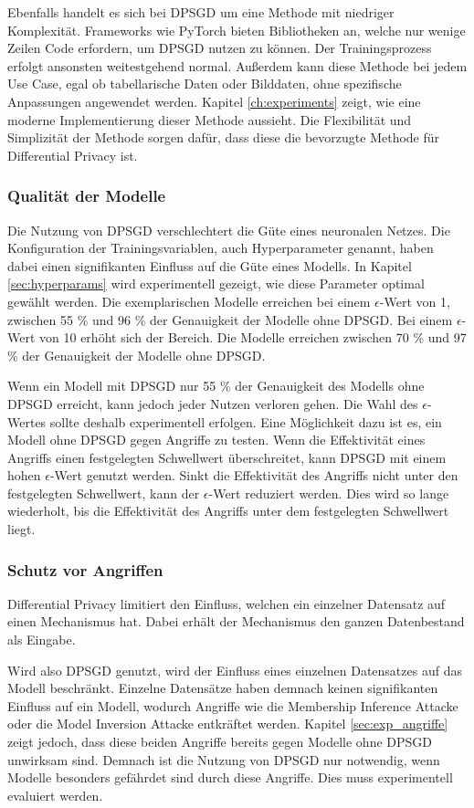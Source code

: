Ebenfalls handelt es sich bei DPSGD um eine Methode mit niedriger Komplexität.
Frameworks wie PyTorch bieten Bibliotheken an, welche nur wenige Zeilen Code erfordern, um DPSGD nutzen zu können.
Der Trainingsprozess erfolgt ansonsten weitestgehend normal.
Außerdem kann diese Methode bei jedem Use Case, egal ob tabellarische Daten oder Bilddaten, ohne spezifische Anpassungen angewendet werden.
Kapitel \ref{ch:experiments} zeigt, wie eine moderne Implementierung dieser Methode aussieht.
Die Flexibilität und Simplizität der Methode sorgen dafür, dass diese die bevorzugte Methode für Differential Privacy ist.

\subsubsection*{Qualität der Modelle}
Die Nutzung von DPSGD verschlechtert die Güte eines neuronalen Netzes.
Die Konfiguration der Trainingsvariablen, auch Hyperparameter genannt, haben dabei einen signifikanten Einfluss auf die Güte eines Modells.
In Kapitel \ref{sec:hyperparams} wird experimentell gezeigt, wie diese Parameter optimal gewählt werden.
Die exemplarischen Modelle erreichen bei einem $\epsilon$-Wert von 1, zwischen 55 \% und 96 \% der Genauigkeit der Modelle ohne DPSGD.
Bei einem $\epsilon$-Wert von 10 erhöht sich der Bereich. 
Die Modelle erreichen zwischen 70 \% und 97 \% der Genauigkeit der Modelle ohne DPSGD.

Wenn ein Modell mit DPSGD nur 55 \% der Genauigkeit des Modells ohne DPSGD erreicht, kann jedoch jeder Nutzen verloren gehen.
Die Wahl des $\epsilon$-Wertes sollte deshalb experimentell erfolgen.
Eine Möglichkeit dazu ist es, ein Modell ohne DPSGD gegen Angriffe zu testen. 
Wenn die Effektivität eines Angriffs einen festgelegten Schwellwert überschreitet, kann DPSGD mit einem hohen $\epsilon$-Wert genutzt werden.
Sinkt die Effektivität des Angriffs nicht unter den festgelegten Schwellwert, kann der $\epsilon$-Wert reduziert werden.
Dies wird so lange wiederholt, bis die Effektivität des Angriffs unter dem festgelegten Schwellwert liegt.

\subsubsection*{Schutz vor Angriffen}
Differential Privacy limitiert den Einfluss, welchen ein einzelner Datensatz auf einen Mechanismus hat.
Dabei erhält der Mechanismus den ganzen Datenbestand als Eingabe.

Wird also DPSGD genutzt, wird der Einfluss eines einzelnen Datensatzes auf das Modell beschränkt.
Einzelne Datensätze haben demnach keinen signifikanten Einfluss auf ein Modell, wodurch Angriffe wie die Membership Inference Attacke oder die Model Inversion Attacke entkräftet werden.
Kapitel \ref{sec:exp_angriffe} zeigt jedoch, dass diese beiden Angriffe bereits gegen Modelle ohne DPSGD unwirksam sind.
Demnach ist die Nutzung von DPSGD nur notwendig, wenn Modelle besonders gefährdet sind durch diese Angriffe. 
Dies muss experimentell evaluiert werden.
